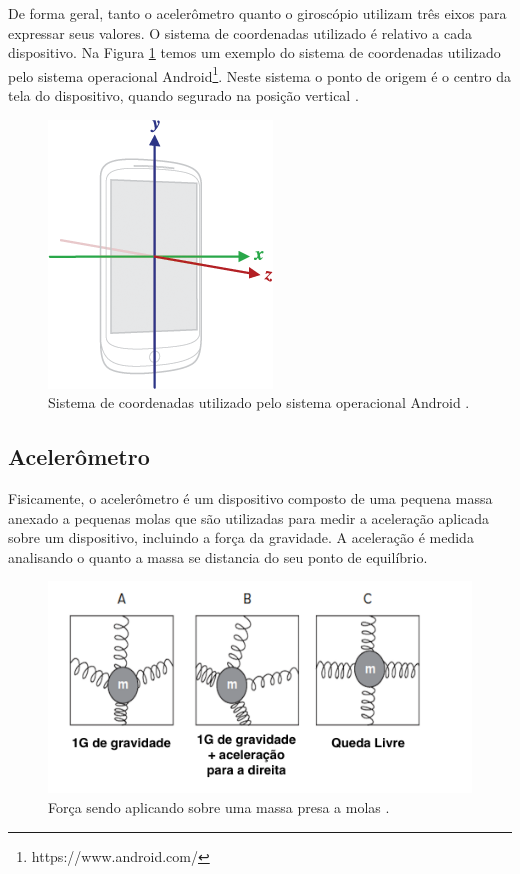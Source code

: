 De forma geral, tanto o acelerômetro quanto o giroscópio utilizam três eixos para expressar seus valores. O sistema de coordenadas utilizado é relativo a cada dispositivo. Na Figura \ref{fig:axis_device} temos um exemplo do sistema de coordenadas utilizado pelo sistema operacional Android\footnote{https://www.android.com/}. Neste sistema o ponto de origem é o centro da tela do dispositivo, quando segurado na posição vertical \citep{sensorAndroidDocs}. 

\begin{figure}[ht]
	\centering
	\includegraphics[scale=0.6]{imagens/axis_device.png}
	\caption{Sistema de coordenadas utilizado pelo sistema operacional Android \citep{sensorAndroidDocs}.}
	\label{fig:axis_device}
\end{figure} 

\subsection{Acelerômetro}
\label{subsec:accelerometer}
Fisicamente, o acelerômetro é um dispositivo composto de uma pequena massa  anexado a pequenas molas que são utilizadas para medir a aceleração aplicada sobre um dispositivo, incluindo a força da gravidade. A aceleração é medida analisando o quanto a massa se distancia do seu ponto de equilíbrio. 

\begin{figure}[ht]
	\centering
	\includegraphics[scale=0.6]{imagens/MEMS_device.png}
	\caption{Força sendo aplicando sobre uma massa presa a molas \citep{milette2012professional}.}
	\label{fig:acelerometro}
\end{figure} 


